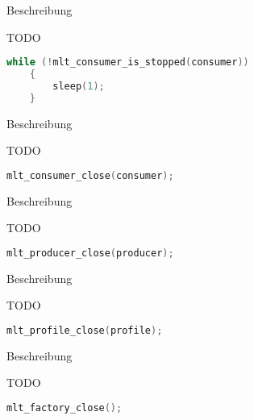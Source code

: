 \documentclass[../MasterThesis.tex]{subfiles}
\begin{document}
\begin{description}[font=\normalfont\color{RedViolet!80!black}, style=nextline]
	
	
	\item[Wait for consumer to terminate???] Beschreibung
	
	TODO
	
	\begin{lstlisting}[language=C, numbers=none, basicstyle=\scriptsize\ttfamily, belowskip=0pt, aboveskip=9pt]
	while (!mlt_consumer_is_stopped(consumer)) 
	{
		sleep(1);
	} \end{lstlisting}
	
	
	
	
	\item[Close the consumer] Beschreibung
	
	TODO
	
	\begin{lstlisting}[language=C, numbers=none, basicstyle=\scriptsize\ttfamily, belowskip=0pt, aboveskip=9pt]
	 mlt_consumer_close(consumer); \end{lstlisting}
	
	
	
	
	\item[Close the producer] Beschreibung
	
	TODO
	
	\begin{lstlisting}[language=C, numbers=none, basicstyle=\scriptsize\ttfamily, belowskip=0pt, aboveskip=9pt]
	mlt_producer_close(producer); \end{lstlisting}
	
	
	
	
	\item[Close the profile] Beschreibung
	
	TODO
	
	\begin{lstlisting}[language=C, numbers=none, basicstyle=\scriptsize\ttfamily, belowskip=0pt, aboveskip=9pt]
	mlt_profile_close(profile); \end{lstlisting}
	
	
	
	\item[Close the factory] Beschreibung
	
	TODO
	
	\begin{lstlisting}[language=C, numbers=none, basicstyle=\scriptsize\ttfamily, belowskip=0pt, aboveskip=9pt]
	mlt_factory_close();
	\end{lstlisting}
	
	
\end{description}
\end{document}
